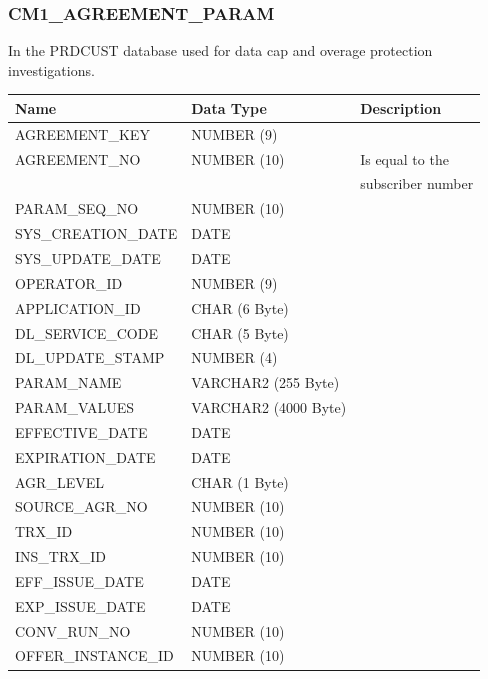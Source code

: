 \documentclass[12pt,twoside]{article}
\begin{document}
\subsubsection{CM1\_AGREEMENT\_PARAM}
\label{sec-8-3-1}

    In the PRDCUST database used for data cap and overage protection investigations.
\scriptsize

\begin{center}
\begin{tabular}{lll}
\hline
 Name                 &  Data Type             &  Description        \\
\hline
 AGREEMENT\_KEY       &  NUMBER (9)            &                     \\
 AGREEMENT\_NO        &  NUMBER (10)           &  Is equal to the    \\
                      &                        &  subscriber number  \\
 PARAM\_SEQ\_NO       &  NUMBER (10)           &                     \\
 SYS\_CREATION\_DATE  &  DATE                  &                     \\
 SYS\_UPDATE\_DATE    &  DATE                  &                     \\
 OPERATOR\_ID         &  NUMBER (9)            &                     \\
 APPLICATION\_ID      &  CHAR (6 Byte)         &                     \\
 DL\_SERVICE\_CODE    &  CHAR (5 Byte)         &                     \\
 DL\_UPDATE\_STAMP    &  NUMBER (4)            &                     \\
 PARAM\_NAME          &  VARCHAR2 (255 Byte)   &                     \\
 PARAM\_VALUES        &  VARCHAR2 (4000 Byte)  &                     \\
 EFFECTIVE\_DATE      &  DATE                  &                     \\
 EXPIRATION\_DATE     &  DATE                  &                     \\
 AGR\_LEVEL           &  CHAR (1 Byte)         &                     \\
 SOURCE\_AGR\_NO      &  NUMBER (10)           &                     \\
 TRX\_ID              &  NUMBER (10)           &                     \\
 INS\_TRX\_ID         &  NUMBER (10)           &                     \\
 EFF\_ISSUE\_DATE     &  DATE                  &                     \\
 EXP\_ISSUE\_DATE     &  DATE                  &                     \\
 CONV\_RUN\_NO        &  NUMBER (10)           &                     \\
 OFFER\_INSTANCE\_ID  &  NUMBER (10)           &                     \\
\hline
\end{tabular}
\end{center}
\end{document}
